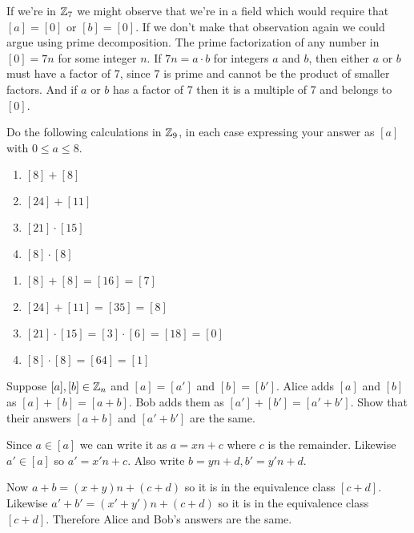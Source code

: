 \documentclass{article}
\begin{document}
If we're in $\mathbb{Z}_7$ we might observe that we're in a field which would require that $[a] = [0]$ or $[b] = [0]$. If we don't make that observation again we could argue using prime decomposition. The prime factorization of any number in $[0] = 7n$ for some integer $n$. If $7n = a \cdot b$ for integers $a$ and $b$, then either $a$ or $b$ must have a factor of 7, since 7 is prime and cannot be the product of smaller factors. And if $a$ or $b$ has a factor of 7 then it is a multiple of 7 and belongs to $[0]$.

\begin{problem}
Do the following calculations in $\mathbb{Z}_9$, in each case expressing your answer as $[a]$ with $0 \leq a \leq 8$.

\begin{enumerate}
  \item $[8] + [8]$
  \item $[24] + [11]$
  \item $[21] \cdot [15]$
  \item $[8] \cdot [8]$
\end{enumerate}
\end{problem}

\begin{enumerate}
  \item $[8] + [8] = [16] = [7]$
  \item $[24] + [11] = [35] = [8]$
  \item $[21] \cdot [15] = [3] \cdot [6] = [18] = [0]$
  \item $[8] \cdot [8] = [64] = [1]$
\end{enumerate}

\begin{problem}
Suppose $[a], [b] \in \mathbb{Z}_n$ and $[a] = [a']$ and $[b] = [b']$. Alice adds $[a]$ and $[b]$ as $[a] + [b] = [a + b]$. Bob adds them as $[a'] + [b'] = [a' + b']$. Show that their answers $[a + b]$ and $[a' + b']$ are the same.
\end{problem}

Since $a \in [a]$ we can write it as $a = xn + c$ where $c$ is the remainder. Likewise $a' \in [a]$ so $a' = x'n + c$. Also write $b = yn + d, b' = y'n + d$.

Now $a + b = (x + y)n + (c + d)$ so it is in the equivalence class $[c + d]$. Likewise $a' + b' = (x' + y')n + (c + d)$ so it is in the equivalence class $[c + d]$. Therefore Alice and Bob's answers are the same.
\end{document}
